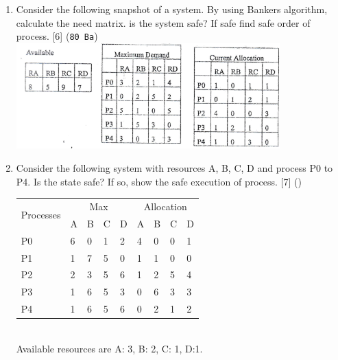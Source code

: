 \documentclass[12pt]{article}
\begin{document}
\begin{enumerate}
			\item Consider the following snapshot of a system. By using Bankers algorithm, calculate the need matrix. is the system safe? If safe find safe order of process. \hfill [6] (\texttt{80 Ba})\\
			\includegraphics[width=4in]{./pics/os_25}

			\item Consider the following system with resources A, B, C, D and process P0 to P4. Is the state safe? If so, show the safe execution of process. \hfill [7] ()\\
			\begin{tabular}{|p{17mm}|p{7mm}|p{7mm}|p{7mm}|p{7mm}||p{7mm}|p{7mm}|p{7mm}|p{7mm}|}
				\hline
				\multirow{2}{*}{Processes} & \multicolumn{4}{|c||}{Max} & \multicolumn{4}{|c|}{Allocation} \\ \cline{2-9}
				& A & B & C & D & A & B & C & D \\ \hline
				P0 & 6 & 0 & 1 & 2 & 4 & 0 & 0 & 1 \\ \hline
				P1 & 1 & 7 & 5 & 0 & 1 & 1 & 0 & 0 \\ \hline
				P2 & 2 & 3 & 5 & 6 & 1 & 2 & 5 & 4 \\ \hline
				P3 & 1 & 6 & 5 & 3 & 0 & 6 & 3 & 3 \\ \hline
				P4 & 1 & 6 & 5 & 6 & 0 & 2 & 1 & 2 \\ \hline
			\end{tabular}\\
			Available resources are A: 3, B: 2, C: 1, D:1.


\end{enumerate}
\end{document}

